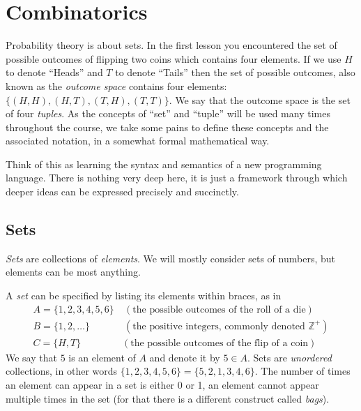 \chapter{Combinatorics}

Probability theory is about sets. In the first lesson you encountered
the set of possible outcomes of flipping two coins which contains four
elements. If we use $H$ to denote ``Heads'' and $T$ to denote
``Tails'' then the set of possible outcomes, also known as the {\em
  outcome space} contains four elements: $\{(H,H),(H,T),(T,H),(T,T)\}$. We say
that the outcome space is the set of four {\em tuples}. As the
concepts of ``set'' and ``tuple'' will be used many times throughout
the course, we take some pains to define these concepts and the
associated notation, in a somewhat formal mathematical way.

Think of this as learning the syntax and semantics of a new
programming language. There is nothing very deep here, it is just a
framework through which deeper ideas can be expressed precisely and
succinctly.

  
\section{Sets}
{\it Sets} are collections of {\it elements}. We will mostly consider sets of
numbers, but elements can be most anything.

A {\it set} can be specified by listing its elements within braces, as in
\begin{align*}
A=\{1,2,3,4,5,6\} &\ (\mbox{the possible outcomes of the roll of a die}) \\
B=\{1,2,\ldots\}  &\ (\mbox{the positive integers, commonly denoted
  $\mathbb{Z}^+$}) \\
C=\{H,T\} & (\mbox{the possible outcomes of the flip of a coin}) 
\end{align*}
We say that $5$ is an element of $A$ and denote it by $5 \in A$. Sets
are {\em unordered} collections, in other words $\{1,2,3,4,5,6\} =
\{5,2,1,3,4,6\}$. The number of times an element can appear in a set
is either 0 or 1, an element cannot appear multiple times in the set
(for that there is a different construct called {\em bags}).

